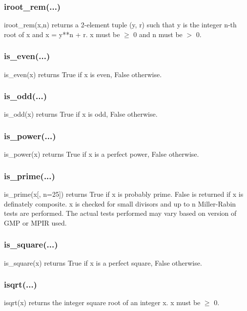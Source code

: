 \subsubsection{iroot\_rem(...)}

iroot\_rem(x,n) returns a 2-element tuple (y, r) such that y is the integer n-th root of x and x =
y**n + r. x must be $\ge$ 0 and n must be $>$ 0.

\subsubsection{is\_even(...)}

is\_even(x) returns True if x is even, False otherwise.

\subsubsection{is\_odd(...)}

is\_odd(x) returns True if x is odd, False otherwise.

\subsubsection{is\_power(...)}

is\_power(x) returns True if x is a perfect power, False otherwise.

\subsubsection{is\_prime(...)}

is\_prime(x[, n=25]) returns True if x is probably prime. False is returned if x is definately
composite. x is checked for small divisors and up to n Miller-Rabin tests are performed. The
actual tests performed may vary based on version of GMP or MPIR used.

\subsubsection{is\_square(...)}

is\_square(x) returns True if x is a perfect square, False otherwise.

\subsubsection{isqrt(...)}

isqrt(x) returns the integer square root of an integer x. x must be $\ge$ 0.

